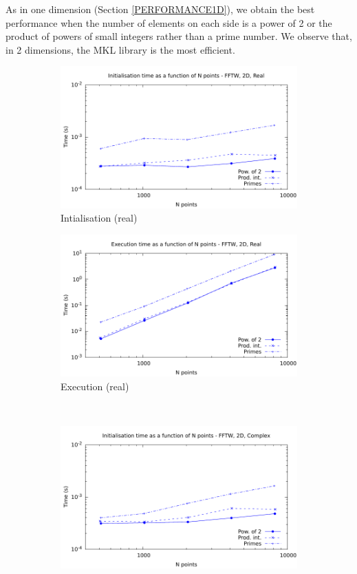 \documentclass[12pt, a4paper]{article}
\begin{document}
 As in one dimension (Section \ref{PERFORMANCE1D}), we obtain the best performance when the number of elements on each side is a power of 2 or the product of powers of small integers rather than a prime number. We observe that, in 2 dimensions, the MKL library is the most efficient.
 

\begin{figure}[H]
\captionsetup{width=0.8\linewidth}
\centering
\begin{subfigure}{.5\textwidth}
\centering
\includegraphics[width=.9\linewidth]{graphs/2d-fftw-init-r.pdf}
\caption{Intialisation (real)}
\label{2DFFTWRI}
\end{subfigure}%
\begin{subfigure}{.5\textwidth}
\centering
\includegraphics[width=.9\linewidth]{graphs/2d-fftw-exec-r.pdf}
\caption{Execution (real)}
\label{2DFFTWR}
\end{subfigure}\\
\begin{subfigure}{.5\textwidth}
\centering
\includegraphics[width=.9\linewidth]{graphs/2d-fftw-init-c.pdf}

\end{subfigure}
\end{figure}
\end{document}

